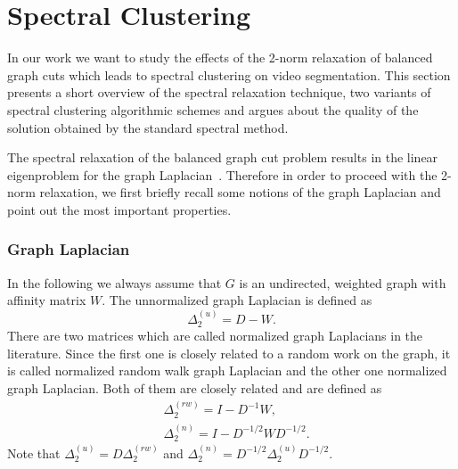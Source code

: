 \section{Spectral Clustering}
\label{sec:ch2_spectclus}
In our work we want to study the effects of the 2-norm relaxation of balanced graph cuts which leads to spectral clustering on video segmentation.
This section presents a short overview of the spectral relaxation technique, two variants of spectral clustering algorithmic schemes and argues about the quality of the solution
obtained by the standard spectral method. 

The spectral relaxation of the balanced graph cut problem results in the linear eigenproblem for the graph Laplacian~\cite{HagenK91,Shi00,Luxb07}. Therefore in order to proceed 
with the 2-norm relaxation, we first briefly recall some notions of the graph Laplacian and point out the most important properties.
\subsubsection*{Graph Laplacian}
In the following we always assume that $G$ is an 
undirected, weighted graph with affinity matrix $W$.
The unnormalized graph Laplacian is defined as 
\begin{equation*}
\Delta_{2}^{(u)} = D-W.
\end{equation*}
There are two matrices which are called normalized graph Laplacians in the literature. Since the first one is closely related to a random work on the graph, it is called normalized random walk graph Laplacian 
and the other one normalized graph Laplacian. Both of them are closely related and are defined as
\begin{equation*}
\begin{aligned}
&\Delta_{2}^{(rw)} = I-D^{-1}W,\\
&\Delta_{2}^{(n)} = I-D^{-1/2}WD^{-1/2}.
\end{aligned}
\end{equation*} 
Note that $\Delta_{2}^{(u)} = D\Delta_{2}^{(rw)}$ and $\Delta_{2}^{(n)} = D^{-1/2}\Delta_{2}^{(u)}D^{-1/2}$.

